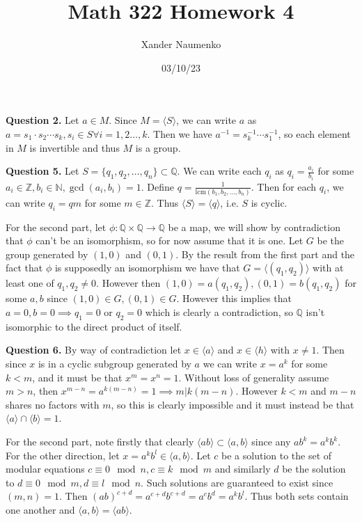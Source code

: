 \documentclass[letterpaper, reqno,11pt]{article}
\begin{document}
\title{Math 322 Homework 4}
\date{03/10/23}
\author{Xander Naumenko}
\maketitle

{\medskip\noindent\bf Question 2.} Let $a\in M$. Since $M=\langle S\rangle$, we can write $a$ as $a=s_1\cdot s_2\cdots s_k, s_i\in S\forall i=1,2\ldots,k$. Then we have $a^{-1}=s_k^{-1}\cdots s_1^{-1}$, so each element in $M$ is invertible and thus $M$ is a group.

{\medskip\noindent\bf Question 5.} Let $S=\{q_1,q_2,\ldots, q_n\}\subset \mathbb{Q}$. We can write each $q_i$ as $q_i=\frac{a_i}{b_i}$ for some $a_i\in \mathbb{Z}, b_i\in \mathbb{N}, \gcd(a_i,b_i)=1$. Define $q=\frac{1}{\text{lcm}(b_1,b_2,\ldots, b_n)}$. Then for each $q_i$, we can write $q_i=qm$ for some $m\in \mathbb{Z}$. Thus $\langle S\rangle=\langle q\rangle$, i.e. $S$ is cyclic.

For the second part, let $\phi:\mathbb{Q}\times \mathbb{Q}\to \mathbb{Q}$ be a map, we will show by contradiction that $\phi$ can't be an isomorphism, so for now assume that it is one. Let $G$ be the group generated by $(1,0)$ and $(0,1)$. By the result from the first part and the fact that $\phi$ is supposedly an isomorphism we have that $G= \langle\left( q_1,q_2 \right)\rangle$ with at least one of $q_1,q_2\neq 0$. However then $(1,0)=a(q_1,q_2),(0,1)=b(q_1,q_2)$ for some $a,b$ since $(1,0)\in G, (0,1)\in G$. However this implies that $a=0,b=0\implies q_1=0$ or $q_2=0$ which is clearly a contradiction, so $\mathbb{Q}$ isn't isomorphic to the direct product of itself.

{\medskip\noindent\bf Question 6.} By way of contradiction let $x\in \langle a\rangle$ and $x\in\langle h\rangle$ with $x\neq 1$. Then since $x$ is in a cyclic subgroup generated by $a$ we can write $x=a^{k}$ for some $k<m$, and it must be that $x^{m}=x^{n}=1$. Without loss of generality assume $m>n$, then $x^{m-n}=a^{k(m-n)}=1\implies m|k(m-n)$. However $k<m$ and $m-n$ shares no factors with $m$, so this is clearly impossible and it must instead be that $\langle a\rangle \cap\langle b\rangle =1$.

For the second part, note firstly that clearly $\langle ab\rangle\subset\langle a,b\rangle$ since any $ab^{k}=a^{k}b^{k}$. For the other direction, let $x=a^{k}b^{l}\in \langle a,b\rangle$. Let $c$ be a solution to the set of modular equations $c\equiv 0\mod n,c\equiv k\mod m$ and similarly $d$ be the solution to $d\equiv 0\mod m, d\equiv l\mod n$. Such solutions are guaranteed to exist since $(m,n)=1$. Then $(ab)^{c+d}=a^{c+d}b^{c+d}=a^{c}b^{d}=a^{k}b^{l}$. Thus both sets contain one another and $\langle a,b\rangle=\langle ab\rangle$.
\end{document}
